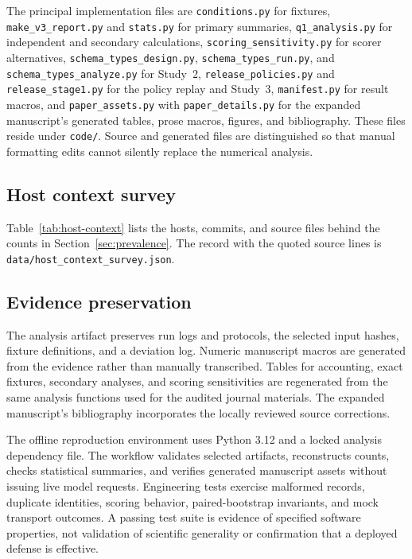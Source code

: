 \documentclass[final,5p,times,twocolumn]{elsarticle}
\begin{document}
The principal implementation files are \texttt{conditions.py} for fixtures,
\texttt{make\_v3\_report.py} and \texttt{stats.py} for primary summaries,
\texttt{q1\_analysis.py} for independent and secondary calculations,
\texttt{scoring\_sensitivity.py} for scorer alternatives,
\texttt{schema\_types\_design.py}, \texttt{schema\_types\_run.py}, and
\texttt{schema\_types\_analyze.py} for Study~2,
\texttt{release\_policies.py} and \texttt{release\_stage1.py} for the policy
replay and Study~3,
\texttt{manifest.py} for result macros, and \texttt{paper\_assets.py} with
\texttt{paper\_details.py} for the expanded manuscript's generated tables,
prose macros, figures, and bibliography. These files
reside under \texttt{code/}. Source and generated files are distinguished so
that manual formatting edits cannot silently replace the numerical analysis.

\subsection{Host context survey}
Table~\ref{tab:host-context} lists the hosts, commits, and source files behind
the counts in Section~\ref{sec:prevalence}. The record with the quoted source
lines is \texttt{data/host\_context\_survey.json}.


\subsection{Evidence preservation}
The analysis artifact preserves run logs and protocols, the selected
input hashes, fixture definitions, and a deviation log. Numeric manuscript
macros are generated from the evidence rather than manually transcribed.
Tables for accounting, exact fixtures, secondary analyses, and scoring
sensitivities are regenerated from the same analysis functions used for the
audited journal materials. The expanded manuscript's bibliography incorporates
the locally reviewed source corrections.

The offline reproduction environment uses Python 3.12 and a locked analysis
dependency file. The workflow validates selected artifacts, reconstructs counts,
checks statistical summaries, and verifies generated manuscript assets without
issuing live model requests. Engineering tests exercise malformed records,
duplicate identities, scoring behavior, paired-bootstrap invariants, and mock
transport outcomes. A passing test suite is evidence of specified software
properties, not validation of scientific generality or confirmation that a
deployed defense is effective.
\end{document}
